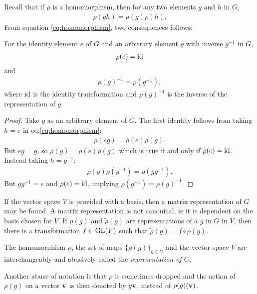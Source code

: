 	Recall that if $\rho$ is a homomorphism, then for any two elements $g$ and $h$ in $G$,
	\begin{align}\label{eq:homomorphism}
		\rho(gh) = \rho(g)\rho(h).
	\end{align}
	From equation \ref{eq:homomorphism}, two consequences follows:	
	\begin{proposition}
		For the identity element $e$ of $G$ and an arbitrary element $g$ with inverse $g^{-1}$ in $G$,
		\begin{align}
			\rho(e) = \text{id}
		\end{align}
		and
		\begin{align}
			\rho(g)^{-1} = \rho(g^{-1}),
		\end{align}
		where $\text{id}$ is the identity transformation and $\rho(g)^{-1}$ is the inverse of the representation of $g$.
	\end{proposition}
	\begin{proof}
		Take $g$ as an arbitrary element of $G$. The first identity follows from taking $h=e$ in eq.\ref{eq:homomorphism}:
		\begin{align}
			\rho(eg) = \rho(e)\rho(g). %
		\end{align}
		But $eg=g$, so $\rho(g) = \rho(e)\rho(g)$ which is true if and only if $\rho(e) = \text{id}$. Instead taking $h=g^{-1}$:
		\begin{align}
			\rho(g) \rho(g^{-1}) =  \rho(gg^{-1}). %
		\end{align}
		But $gg^{-1} = e$ and $\rho(e) = \text{id}$, implying $\rho(g^{-1}) = \rho(g)^{-1}$.
	\end{proof}
	
	\begin{note}
		If the vector space $V$ is provided with a basis, then a matrix representation of $G$ may be found. A matrix representation is not canonical, ie it is dependent on the basis chosen for $V$. If $\rho(g)$ and $\tilde{\rho}(g)$ are representations of a $g$ in $G$ in $V$, then there is a transformation $f \in \text{GL}(V)$ such that $\tilde{\rho}(g) = f \circ \rho(g)$.
	\end{note}
	
	\begin{note}
		The homomorphism $\rho$, the set of maps $\{\rho(g)\}_{g \in G}$ and the vector space $V$ are interchangeably and abusively called the \textit{representation of $G$}.
	\end{note}
	
	\begin{note}
		Another abuse of notation is that $\rho$ is sometimes dropped and the action of $\rho(g)$ on a vector $\mathbf{v}$ is then denoted by $g\mathbf{v}$, instead of $\rho(g)(\mathbf{v})$.
	\end{note}
	
